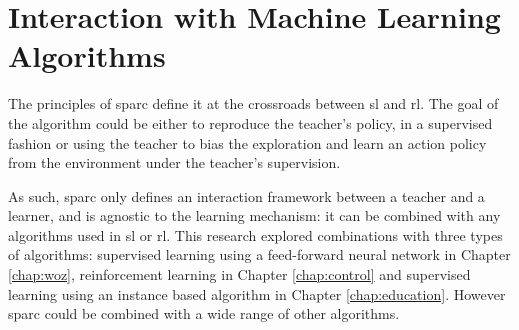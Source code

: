 

\section{Interaction with Machine Learning Algorithms}

The principles of \gls{sparc} define it at the crossroads between \acrlong{sl} and \acrlong{rl}. The  goal of the algorithm could be either to reproduce the teacher's policy, in a supervised fashion or using the teacher to bias the exploration and learn an action policy from the environment under the teacher's supervision.

As such, \gls{sparc} only defines an interaction framework between a teacher and a learner, and is agnostic to the learning mechanism: it can be combined with any algorithms used in \acrlong{sl} or \acrlong{rl}. This research explored combinations with three types of algorithms: supervised learning using a feed-forward neural network in Chapter \ref{chap:woz}, reinforcement learning in Chapter \ref{chap:control} and supervised learning using an instance based algorithm in Chapter \ref{chap:education}. However \gls{sparc} could be combined with a wide range of other algorithms.


